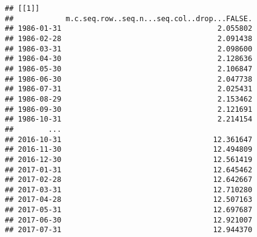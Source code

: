 \documentclass[
]{article}
\newenvironment{Shaded}{\begin{snugshade}}{\end{snugshade}}
\newcommand{\AttributeTok}[1]{\textcolor[rgb]{0.13,0.29,0.53}{#1}}
\newcommand{\CommentTok}[1]{\textcolor[rgb]{0.56,0.35,0.01}{\textit{#1}}}
\newcommand{\ControlFlowTok}[1]{\textcolor[rgb]{0.13,0.29,0.53}{\textbf{#1}}}
\newcommand{\DecValTok}[1]{\textcolor[rgb]{0.00,0.00,0.81}{#1}}
\newcommand{\FunctionTok}[1]{\textcolor[rgb]{0.13,0.29,0.53}{\textbf{#1}}}
\newcommand{\NormalTok}[1]{#1}
\newcommand{\OtherTok}[1]{\textcolor[rgb]{0.56,0.35,0.01}{#1}}
\newcommand{\SpecialCharTok}[1]{\textcolor[rgb]{0.81,0.36,0.00}{\textbf{#1}}}
\newcommand{\StringTok}[1]{\textcolor[rgb]{0.31,0.60,0.02}{#1}}
\begin{document}
\begin{Shaded}
\end{Shaded}

\begin{verbatim}
## [[1]]
##            m.c.seq.row..seq.n...seq.col..drop...FALSE.
## 1986-01-31                                    2.055802
## 1986-02-28                                    2.091438
## 1986-03-31                                    2.098600
## 1986-04-30                                    2.128636
## 1986-05-30                                    2.106847
## 1986-06-30                                    2.047738
## 1986-07-31                                    2.025431
## 1986-08-29                                    2.153462
## 1986-09-30                                    2.121691
## 1986-10-31                                    2.214154
##        ...                                            
## 2016-10-31                                   12.361647
## 2016-11-30                                   12.494809
## 2016-12-30                                   12.561419
## 2017-01-31                                   12.645462
## 2017-02-28                                   12.642667
## 2017-03-31                                   12.710280
## 2017-04-28                                   12.507163
## 2017-05-31                                   12.697687
## 2017-06-30                                   12.921007
## 2017-07-31                                   12.944370
\end{verbatim}
\end{document}
